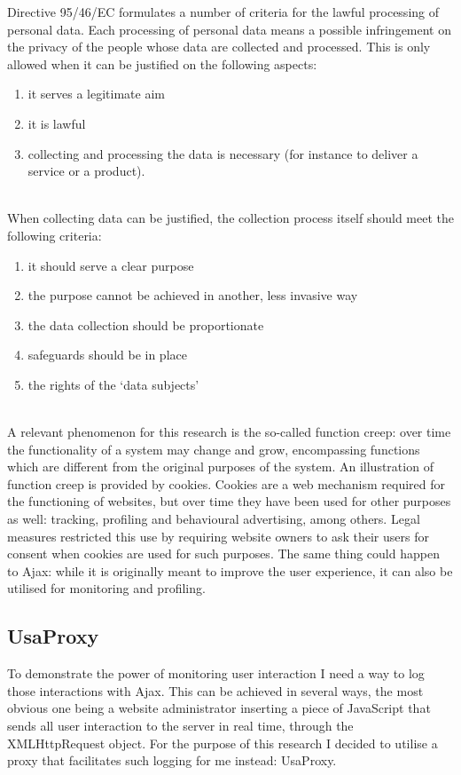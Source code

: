 Directive 95/46/EC formulates a number of criteria for the lawful processing of personal data. Each processing of personal data means a possible infringement on the privacy of the people whose data are collected and processed. This is only allowed when it can be justified on the following aspects:
\begin{enumerate}
	\item it serves a legitimate aim
	\item it is lawful
	\item collecting and processing the data is necessary (for instance to deliver a service or a product).
\end{enumerate}
~\\
When collecting data can be justified, the collection process itself should meet the following criteria:
\begin{enumerate}
	\item it should serve a clear purpose
	\item the purpose cannot be achieved in another, less invasive way 
	\item the data collection should be proportionate
	\item safeguards should be in place 
	\item the rights of the `data subjects'
\end{enumerate}
~\\
A relevant phenomenon for this research is the so-called function creep: over time the functionality of a system may change and grow, encompassing functions which are different from the original purposes of the system. An illustration of function creep is provided by cookies. Cookies are a web mechanism required for the functioning of websites, but over time they have been used for other purposes as well: tracking, profiling and behavioural advertising, among others. Legal measures restricted this use by requiring website owners to ask their users for consent when cookies are used for such purposes. The same thing could happen to Ajax: while it is originally meant to improve the user experience, it can also be utilised for monitoring and profiling.

\subsection{UsaProxy}
To demonstrate the power of monitoring user interaction I need a way to log those interactions with Ajax. This can be achieved in several ways, the most obvious one being a website administrator inserting a piece of JavaScript that sends all user interaction to the server in real time, through the XMLHttpRequest object. For the purpose of this research I decided to utilise a proxy that facilitates such logging for me instead: UsaProxy.\\

